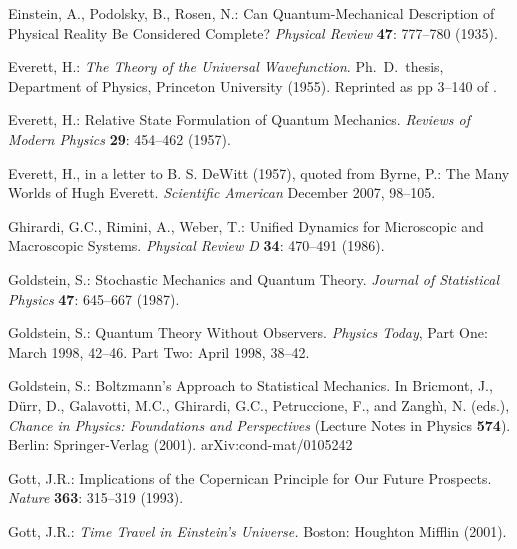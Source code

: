 \documentclass[12pt]{article}
\begin{document}
\begin{thebibliography}{29}

 Einstein, A., Podolsky, B., Rosen, N.: 
	Can Quantum-Mechanical Description of Physical Reality Be Considered Complete?
	\textit{Physical Review} \textbf{47}: 777--780 (1935).

  Everett, H.: 
	\textit{The Theory of the Universal Wavefunction}.
	Ph.~D.~thesis, Department of Physics, Princeton University (1955).
	Reprinted as pp 3--140 of \cite{dewittgraham}. 

 Everett, H.:  
	Relative State Formulation of Quantum Mechanics. 
	\textit{Reviews of Modern Physics} \textbf{29}: 454--462 (1957).

 Everett, H., in a letter to B. S. DeWitt (1957), quoted from Byrne, P.: The Many Worlds of Hugh Everett. \textit{Scientific American} December 2007, 98--105.

 Ghirardi, G.C., Rimini, A., Weber, T.: Unified
  Dynamics for Microscopic and Macroscopic Systems. \textit{Physical Review
    D} \textbf{34}: 470--491 (1986).

 Goldstein, S.: Stochastic Mechanics and Quantum
  Theory. \textit{Journal of Statistical Physics} \textbf{47}: 645--667 (1987).

 Goldstein, S.: Quantum Theory Without Observers.
  \textit{Physics Today}, Part One: March 1998, 42--46. 
  Part Two: April 1998, 38--42.

 Goldstein, S.: 
	Boltzmann's Approach to Statistical Mechanics. 
	In Bricmont, J., D\"urr, D.,  Galavotti, M.C.,  Ghirardi, G.C., 
	Petruccione, F., and Zangh\`{\i}, N. (eds.), 
	{\em Chance in Physics: Foundations and Perspectives} 
	(Lecture Notes in Physics \textbf{574}). 
	Berlin: Springer-Verlag (2001). arXiv:cond-mat/0105242


 Gott, J.R.: 
	Implications of the Copernican Principle for Our Future Prospects.
	\textit{Nature} \textbf{363}: 315--319 (1993).

 Gott, J.R.:
	\textit{Time Travel in Einstein's Universe.}
	Boston: Houghton Mifflin (2001).



\end{thebibliography}
\end{document}
